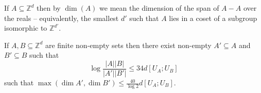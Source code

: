 \begin{definition}
  \label{dimension-def}
  \leanok

  If $A\subseteq \mathbb{Z}^{d}$ then by $\dim(A)$ we mean the dimension of the span of $A-A$
  over the reals -- equivalently, the smallest $d'$ such that $A$ lies in a coset of a subgroup
  isomorphic to $\mathbb{Z}^{d'}$.
\end{definition}


\begin{theorem}\label{weak-pfr-asymm}\leanok
If $A,B\subseteq \mathbb{Z}^d$ are finite non-empty sets then there exist non-empty $A'\subseteq A$ and $B'\subseteq B$ such that
\[\log\frac{\lvert A\rvert\lvert B\rvert}{\lvert A'\rvert\lvert B'\rvert}\leq 34d[U_A;U_B]\]
such that $\max(\dim A',\dim B')\leq \frac{40}{\log 2} d[U_A;U_B]$.
\end{theorem}
